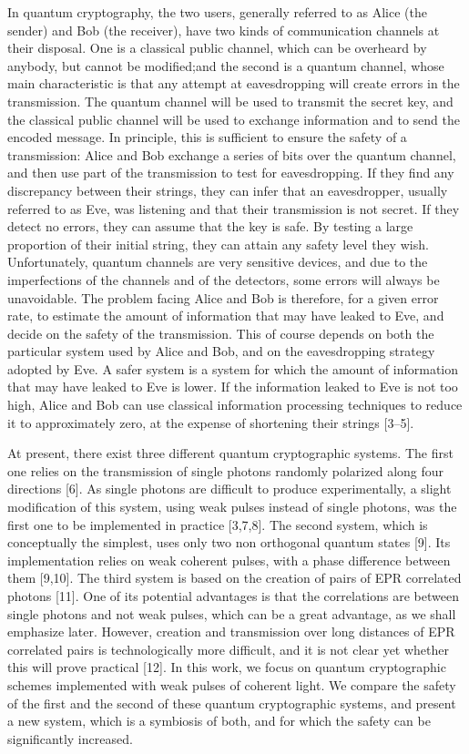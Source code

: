 In quantum cryptography, the two users, generally referred to as Alice (the sender) and Bob (the receiver), have two kinds of communication channels at their disposal. One is a classical public channel, which can be overheard by anybody, but cannot be modified;and the second is a quantum channel, whose main characteristic is that any attempt at eavesdropping will create errors in the transmission. The quantum channel will be used to transmit the secret key, and the classical public channel will be used to exchange information and to send the encoded message. In principle, this is sufficient to ensure the safety of a transmission: Alice and Bob exchange a series of bits over the quantum channel, and then use part of the transmission to test for eavesdropping. If they find any discrepancy between their strings, they can infer that an eavesdropper, usually referred to as Eve, was listening and that their transmission is not secret. If they detect no errors, they can assume that the key is safe. By testing a large proportion of their initial string, they can attain any safety level they wish. Unfortunately, quantum channels are very sensitive devices, and due to the imperfections of the channels and of the detectors, some errors will always be unavoidable. The problem facing Alice and Bob is therefore, for a given error rate, to estimate the amount of information that may have leaked to Eve, and decide on the safety of the transmission. This of course depends on both the particular system used by Alice and Bob, and on the eavesdropping strategy adopted by Eve. A safer system is a system for which the amount of information that may have leaked to Eve is lower. If the information leaked to Eve is not too high, Alice and Bob can use classical information processing techniques to reduce it to approximately zero, at the expense of shortening their strings [3–5].

At present, there exist three different quantum cryptographic systems. The first one relies on the transmission of single photons randomly polarized along four directions [6].
As single photons are difficult to produce experimentally, a slight modification of this system, using weak pulses instead of single photons, was the first one to be implemented in practice [3,7,8]. The second system, which is conceptually the simplest, uses only two non orthogonal quantum states [9]. Its implementation relies on weak coherent pulses, with a phase difference between them [9,10]. The third system is based on the creation of pairs of EPR correlated photons [11]. One of its potential advantages is that the correlations are between single photons and not weak pulses, which can be a great advantage, as we shall emphasize later. However, creation and transmission over long distances of EPR correlated pairs is technologically more difficult, and it is not clear yet whether this will prove practical [12]. In this work, we focus on quantum cryptographic schemes implemented with weak pulses of coherent light. We compare the safety of the first and the second of these quantum cryptographic systems, and present a new system, which is a symbiosis of both, and for which the safety can be significantly increased.

